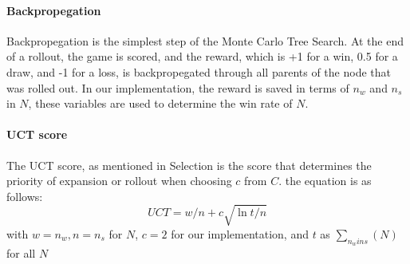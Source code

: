 \documentclass[../report.tex]{subfiles}
\begin{document}
\paragraph{Backpropegation}
Backpropegation is the simplest step of the Monte Carlo Tree Search. At the end of a rollout, the game is scored, and the reward, which is +1 for a win, 0.5 for a draw, and -1 for a loss, is backpropegated through all parents of the node that was rolled out. In our implementation, the reward is saved in terms of $n_w$ and $n_s$ in $N$, these variables are used to determine the win rate of $N$. 

\paragraph{UCT score}
The UCT score, as mentioned in Selection is the score that determines the priority of expansion or rollout when choosing $c$ from $C$. the equation is as follows:
\begin{equation}\label{eq:uct}
    UCT=w/n + c \sqrt{\ln{t}/n}
\end{equation}
with $w = n_w, n = n_s$ for $N$, $c = 2$ for our implementation, and $t$ as $\sum_{n_wins}(N)$ for all $N$
\end{document}
